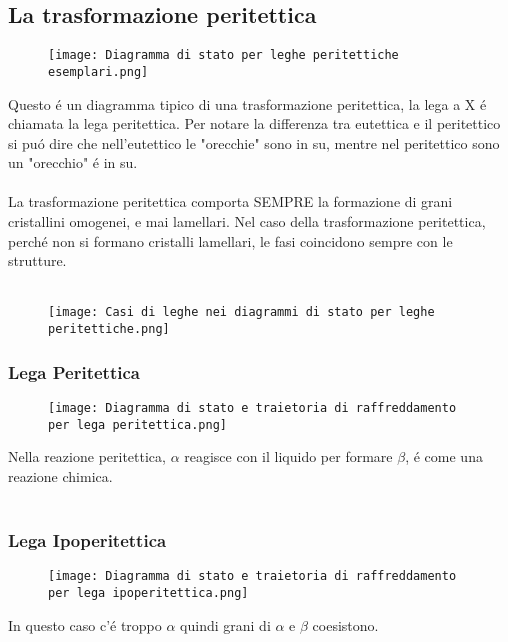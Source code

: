 \documentclass{article}
\begin{document}
{        \subsection{La trasformazione peritettica}
            \begin{figure}[h!]
                \centering
                \texttt{[image: Diagramma di stato per leghe peritettiche esemplari.png]}
            \end{figure}
            Questo \'e un diagramma tipico di una trasformazione peritettica, la lega a X \'e chiamata la lega peritettica. Per notare la differenza tra eutettica e il peritettico si pu\'o dire che nell'eutettico le "orecchie" sono in su, mentre nel peritettico sono un "orecchio" \'e in su.\\ \\
            La trasformazione peritettica comporta SEMPRE la formazione di grani cristallini omogenei, e mai lamellari. Nel caso della trasformazione peritettica, perch\'e non si formano cristalli lamellari, le fasi coincidono sempre con le strutture.\\ \\
            \newpage
            \begin{figure}[h!]
                \centering
                \texttt{[image: Casi di leghe nei diagrammi di stato per leghe peritettiche.png]}
            \end{figure}
            \subsubsection{Lega Peritettica}
                \begin{figure}[h!]
                    \centering
                    \texttt{[image: Diagramma di stato e traietoria di raffreddamento per lega peritettica.png]}
                \end{figure}
                Nella reazione peritettica, $\alpha$ reagisce con il liquido per formare $\beta$, \'e come una reazione chimica.\\ \\
            \subsubsection{Lega Ipoperitettica}
                \begin{figure}[h!]
                    \centering
                    \texttt{[image: Diagramma di stato e traietoria di raffreddamento per lega ipoperitettica.png]}
                \end{figure}
                In questo caso c'\'e troppo $\alpha$ quindi grani di $\alpha$ e $\beta$ coesistono.\\ \\
}
\end{document}
